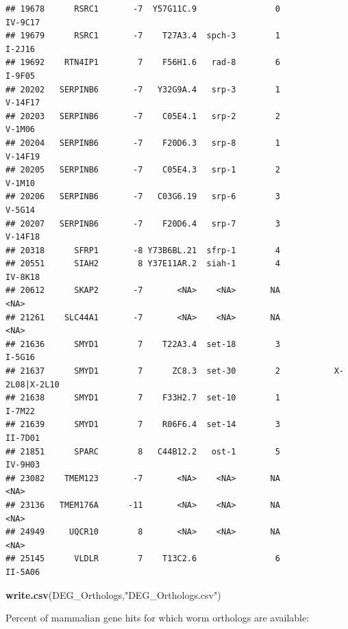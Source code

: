 \documentclass[
]{article}
\newenvironment{Shaded}{\begin{snugshade}}{\end{snugshade}}
\newcommand{\KeywordTok}[1]{\textcolor[rgb]{0.13,0.29,0.53}{\textbf{#1}}}
\newcommand{\NormalTok}[1]{#1}
\newcommand{\OperatorTok}[1]{\textcolor[rgb]{0.81,0.36,0.00}{\textbf{#1}}}
\newcommand{\StringTok}[1]{\textcolor[rgb]{0.31,0.60,0.02}{#1}}
\begin{document}
\begin{verbatim}
## 19678      RSRC1       -7  Y57G11C.9                0                 IV-9C17
## 19679      RSRC1       -7    T27A3.4  spch-3        1                  I-2J16
## 19692    RTN4IP1        7    F56H1.6   rad-8        6                  I-9F05
## 20202   SERPINB6       -7   Y32G9A.4   srp-3        1                 V-14F17
## 20203   SERPINB6       -7    C05E4.1   srp-2        2                  V-1M06
## 20204   SERPINB6       -7    F20D6.3   srp-8        1                 V-14F19
## 20205   SERPINB6       -7    C05E4.3   srp-1        2                  V-1M10
## 20206   SERPINB6       -7   C03G6.19   srp-6        3                  V-5G14
## 20207   SERPINB6       -7    F20D6.4   srp-7        3                 V-14F18
## 20318      SFRP1       -8 Y73B6BL.21  sfrp-1        4                        
## 20551      SIAH2        8 Y37E11AR.2  siah-1        4                 IV-8K18
## 20612      SKAP2       -7       <NA>    <NA>       NA                    <NA>
## 21261    SLC44A1       -7       <NA>    <NA>       NA                    <NA>
## 21636      SMYD1        7    T22A3.4  set-18        3                  I-5G16
## 21637      SMYD1        7      ZC8.3  set-30        2           X-2L08|X-2L10
## 21638      SMYD1        7    F33H2.7  set-10        1                  I-7M22
## 21639      SMYD1        7    R06F6.4  set-14        3                 II-7D01
## 21851      SPARC        8   C44B12.2   ost-1        5                 IV-9H03
## 23082    TMEM123       -7       <NA>    <NA>       NA                    <NA>
## 23136   TMEM176A      -11       <NA>    <NA>       NA                    <NA>
## 24949     UQCR10        8       <NA>    <NA>       NA                    <NA>
## 25145      VLDLR        7    T13C2.6                6                 II-5A06
\end{verbatim}

\begin{Shaded}
\begin{Highlighting}[]
\KeywordTok{write.csv}\NormalTok{(DEG_Orthologs,}\StringTok{"DEG_Orthologs.csv"}\NormalTok{)}
\end{Highlighting}
\end{Shaded}

Percent of mammalian gene hits for which worm orthologs are available:

\begin{Shaded}
\end{Shaded}
\end{document}
